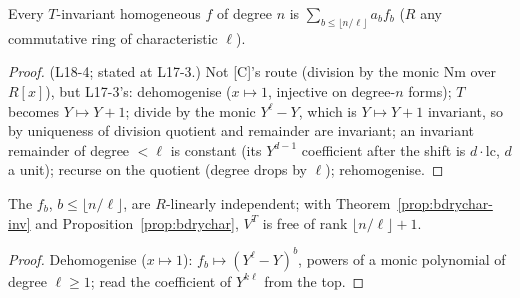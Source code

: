 \begin{theorem}\label{prop:bdrychar-inv}
  \leanok
  Every $T$-invariant homogeneous $f$ of degree $n$ is $\sum_{b\le\lfloor n/\ell\rfloor}a_bf_b$ ($R$ any commutative ring of
  characteristic $\ell$).
\end{theorem}
\begin{proof}
  \leanok
  (L18-4; stated at L17-3.) Not [C]'s route (division by the monic $\mathrm{Nm}$ over $R[x]$), but L17-3's: dehomogenise
  ($x\mapsto1$, injective on degree-$n$ forms); $T$ becomes $Y\mapsto Y+1$; divide by the monic $Y^\ell-Y$, which is
  $Y\mapsto Y+1$ invariant, so by uniqueness of division quotient and remainder are invariant; an invariant remainder of degree
  $<\ell$ is constant (its $Y^{d-1}$ coefficient after the shift is $d\cdot\mathrm{lc}$, $d$ a unit); recurse on the quotient
  (degree drops by $\ell$); rehomogenise.
\end{proof}

\begin{proposition}\label{prop:bdrychar-indep}
  \leanok
  The $f_b$, $b\le\lfloor n/\ell\rfloor$, are $R$-linearly independent; with Theorem~\ref{prop:bdrychar-inv} and
  Proposition~\ref{prop:bdrychar}, $V^T$ is free of rank $\lfloor n/\ell\rfloor+1$.
\end{proposition}
\begin{proof}
  \leanok
  Dehomogenise ($x\mapsto1$): $f_b\mapsto(Y^\ell-Y)^b$, powers of a monic polynomial of degree $\ell\ge1$; read the coefficient of
  $Y^{k\ell}$ from the top.
\end{proof}

